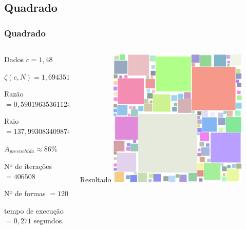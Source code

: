 \documentclass[aspectratio=169]{beamer}
\begin{document}
\subsection{Quadrado}
\begin{frame}
\frametitle{Quadrado}
\begin{columns}[T]
\begin{column}{.5\textwidth}
\begin{block}{\centering Dados}
$c=1,48$
\smallskip

$\zeta(c,N)=1,694351369474375$
\smallskip

Razão $=0,5901963536112477$
\smallskip

Raio $=137,99308340987494$
\smallskip

$A_{preenchida} \approx 86\%$
\smallskip

Nº de iterações $=406508$
\smallskip

Nº de formas $=120$
\smallskip

tempo de execução $= 0,271$ segundos.
\smallskip
\end{block}
\end{column}

\begin{column}{.5\textwidth}
\begin{block}{\centering Resultado}
\centering
\includegraphics[width=0.7\textwidth]{exemplo5}
\end{block}
\end{column}
\end{columns}
\end{frame}
\end{document}
